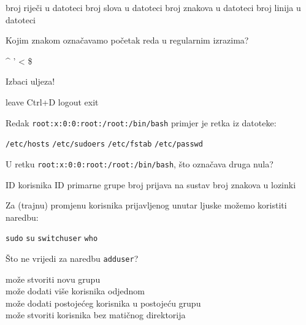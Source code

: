 \documentclass[a4paper,11pt]{exam}
\newcommand{\shell}[1]{\texttt{#1}}
\begin{document}
\begin{questions}
	\begin{oneparchoices}
		\choice broj riječi u datoteci
		\CorrectChoice broj slova u datoteci
		\choice broj znakova u datoteci
		\choice broj linija u datoteci
	\end{oneparchoices}
	
	\question
	Kojim znakom označavamo početak reda u regularnim izrazima? 
	
	\begin{oneparchoices}
		\choice \textasciicircum
		\choice '
		\CorrectChoice <
		\choice \$ 
	\end{oneparchoices}
	
	\question
	Izbaci uljeza!
	
	\begin{oneparchoices}
		\CorrectChoice leave
		\choice Ctrl+D
		\choice logout
		\choice exit
	\end{oneparchoices}

	\question
	Redak \shell{root:x:0:0:root:/root:/bin/bash} primjer je retka iz datoteke:
	
	\begin{oneparchoices}
		\choice \shell{/etc/hosts} 
		\choice \shell{/etc/sudoers} 
		\choice \shell{/etc/fstab} 
		\CorrectChoice \shell{/etc/passwd}
	\end{oneparchoices}
	
	\question
	U retku \shell{root:x:0:0:root:/root:/bin/bash}, što označava druga nula?
	
	\begin{oneparchoices}
		\choice ID korisnika
		\CorrectChoice ID primarne grupe
		\choice broj prijava na sustav
		\choice broj znakova u lozinki
	\end{oneparchoices}
	
	\question
	Za (trajnu) promjenu korisnika prijavljenog unutar ljuske možemo koristiti naredbu:
	
	\begin{oneparchoices}
		\choice \shell{sudo}
		\CorrectChoice \shell{su}
		\choice \shell{switchuser}
		\choice \shell{who}
	\end{oneparchoices}
	
	\question
	Što ne vrijedi za naredbu \shell{adduser}?
	
	\begin{oneparchoices}
		\choice može stvoriti novu grupu \\
		\CorrectChoice može dodati više korisnika odjednom \\
		\choice može dodati postojećeg korisnika u postojeću grupu \\
		\choice može stvoriti korisnika bez matičnog direktorija
	\end{oneparchoices}
	

\end{questions}
\end{document}
